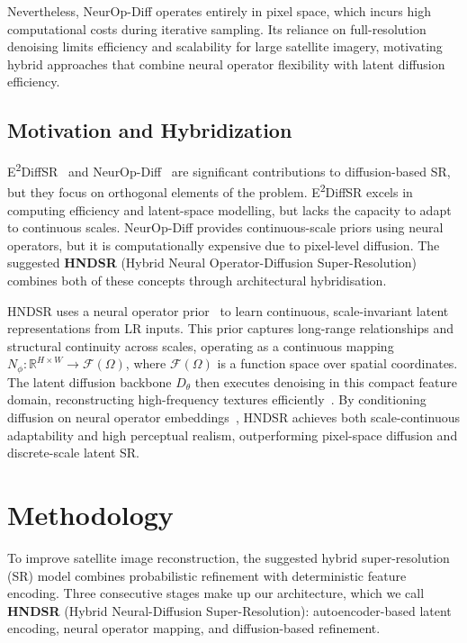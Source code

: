 \documentclass[conference]{IEEEtran}
\begin{document}
Nevertheless, NeurOp-Diff operates entirely in pixel space, which incurs high computational costs during iterative sampling. Its reliance on full-resolution denoising limits efficiency and scalability for large satellite imagery, motivating hybrid approaches that combine neural operator flexibility with latent diffusion efficiency.

\subsection{Motivation and Hybridization}

E\textsuperscript{2}DiffSR~\cite{e2diffsr} and NeurOp-Diff~\cite{neurOpDiff} are significant contributions to diffusion-based SR, but they focus on orthogonal elements of the problem.  E\textsuperscript{2}DiffSR excels in computing efficiency and latent-space modelling, but lacks the capacity to adapt to continuous scales.  NeurOp-Diff provides continuous-scale priors using neural operators, but it is computationally expensive due to pixel-level diffusion.  The suggested \textbf{HNDSR} (Hybrid Neural Operator-Diffusion Super-Resolution) combines both of these concepts through architectural hybridisation.

HNDSR uses a neural operator prior~\cite{li2020fourier, kovachki2021neural} to learn continuous, scale-invariant latent representations from LR inputs.  This prior captures long-range relationships and structural continuity across scales, operating as a continuous mapping $N_{\phi}: \mathbb{R}^{H\times W} \rightarrow \mathcal{F}(\Omega)$, where $\mathcal{F}(\Omega)$ is a function space over spatial coordinates.  The latent diffusion backbone $D_{\theta}$ then executes denoising in this compact feature domain, reconstructing high-frequency textures efficiently~\cite{rombach2022high}.  By conditioning diffusion on neural operator embeddings~\cite{rombach2022high}, HNDSR achieves both scale-continuous adaptability and high perceptual realism, outperforming pixel-space diffusion and discrete-scale latent SR.



\section{Methodology}

To improve satellite image reconstruction, the suggested hybrid super-resolution (SR) model combines probabilistic refinement with deterministic feature encoding.  Three consecutive stages make up our architecture, which we call \textbf{HNDSR} (Hybrid Neural-Diffusion Super-Resolution): autoencoder-based latent encoding, neural operator mapping, and diffusion-based refinement.
\end{document}
